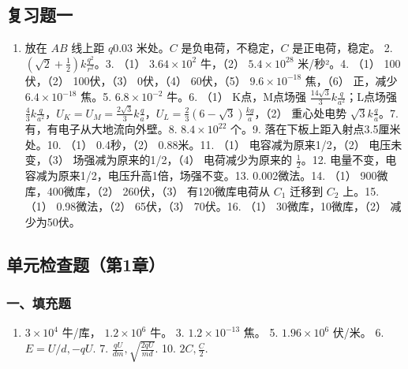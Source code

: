 \subsection{复习题一}\label{ux590dux4e60ux9898ux4e00-1}

\begin{enumerate}
\def\labelenumi{\arabic{enumi}.}
\tightlist
\item
  放在 \(AB\) 线上距 \(q0.03\) 米处。\(C\) 是负电荷，不稳定，\(C\)
  是正电荷，稳定。 2.
  \(\left(\sqrt{2} + \frac{1}{2}\right)k\frac{q^2}{r^2}\)。3. （1）
  \(3.64 \times 10^2\) 牛，（2） \(5.4 \times 10^{28}\) 米/秒²。4. （1）
  100伏，（2） 100伏，（3） 0伏，（4） 60伏，（5）
  \(9.6 \times 10^{-18}\) 焦，（6） 正，减少 \(6.4 \times 10^{-18}\)
  焦。5. \(6.8 \times 10^{-2}\) 牛。6. （1） K点，M点场强
  \(\frac{14\sqrt{3}}{3} k\frac{q}{a^2}\)；L点场强
  \(\frac{4}{3} k\frac{q}{a^2}\)，\(U_K = U_M = \frac{2\sqrt{3}}{3} k\frac{q}{a}\)，\(U_L = \frac{2}{3}(6 - \sqrt{3}) \frac{kg}{a}\)，（2）
  重心处电势 \(\sqrt{3} k\frac{q}{a}\)。7. 有，有电子从大地流向外壁。8.
  \(8.4 \times 10^{22}\) 个。9. 落在下板上距入射点3.5厘米处。10. （1）
  0.4秒，（2） 0.88米。11. （1） 电容减为原来1/2，（2） 电压未变，（3）
  场强减为原来的1/2，（4） 电荷减少为原来的 \(\frac{1}{2}\)。12.
  电量不变，电容减为原来1/2，电压升高1倍，场强不变。13. 0.002微法。14.
  （1） 900微库，400微库，（2） 260伏，（3） 有120微库电荷从 \(C_1\)
  迁移到 \(C_2\) 上。15. （1） 0.98微法，（2） 65伏，（3） 70伏。16.
  （1） 30微库，10微库，（2） 减少为50伏。
\end{enumerate}

\subsection{单元检查题（第1章）}\label{ux5355ux5143ux68c0ux67e5ux9898ux7b2c1ux7ae0-1}

\subsubsection{一、填充题}\label{ux4e00ux586bux5145ux9898-3}

\begin{enumerate}
\def\labelenumi{\arabic{enumi}.}
\setcounter{enumi}{1}
\tightlist
\item
  \(3 \times 10^{4}\) 牛/库， \(1.2 \times 10^{6}\) 牛。 3.
  \(1.2 \times 10^{-13}\) 焦。 5. \(1.96 \times 10^{6}\) 伏/米。 6.
  \(E = U / d, -qU\). 7. \(\frac{qU}{dm}, \sqrt{\frac{2qU}{md}}\). 10.
  \(2C, \frac{C}{2}\).
\end{enumerate}

